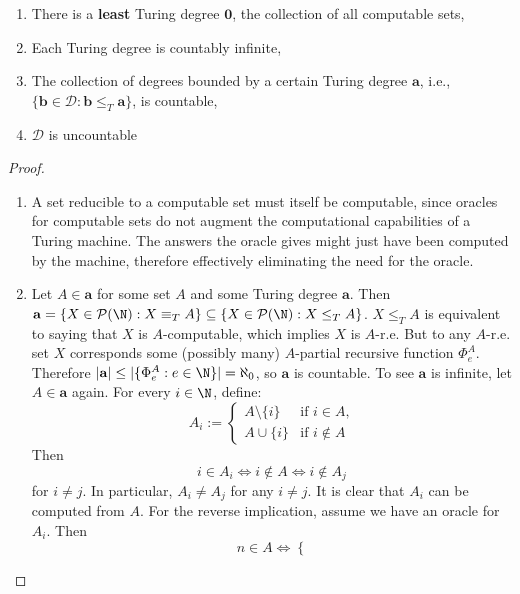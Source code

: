 \documentclass[../main.tex]{memoir}
\begin{document}
\begin{theorem}
  \begin{enumerate}
  \item There is a \textbf{least} Turing degree $\mathbf{0}$, the collection of all computable sets,
  \item Each Turing degree is countably infinite,
  \item The collection of degrees bounded by a certain Turing degree $\mathbf{a}$, i.e., $\{\mathbf{b} \in \mathbf{\mathcal{D}} : \mathbf{b} \le_T \mathbf{a}\}$, is countable,
  \item $\mathbf{\mathcal{D}}$ is uncountable
  \end{enumerate}
\end{theorem}
\begin{proof}
  \begin{enumerate}
  \item A set reducible to a computable set must itself be computable, since oracles for computable sets do not augment the computational capabilities of a Turing machine. The answers the oracle gives might just have been computed by the machine, therefore effectively eliminating the need for the oracle.
  \item Let $A \in \mathbf{a}$ for some set $A$ and some Turing degree $\mathbf{a}$. Then $\mathbf{a} = \{X \in \mathcal{P}(\N): X \equiv_T A\} \subseteq \{X \in \mathcal{P}(\N): X \le_T A\}$. $X \le_T A$ is equivalent to saying that $X$ is $A$-computable, which implies $X$ is $A$-r.e. But to any $A$-r.e. set $X$ corresponds some (possibly many) $A$-partial recursive function $\Phi_e^A$. Therefore $|\mathbf{a}| \le |\{\Phi_e^A: e \in \N\}| = \aleph_0$, so $\mathbf{a}$ is countable. To see $\mathbf{a}$ is infinite, let $A \in \mathbf{a}$ again. For every $i \in \N$, define:
    \begin{equation*}
      A_i := \left\{
        \begin{array}{lr}
          A \setminus \{i\} & \text{if } i \in A \text{,} \\
          A \cup \{i\} & \text{if } i \not\in A
        \end{array}
      \right.
    \end{equation*}
    Then
    \[ i \in A_i \iff i \not\in A \iff i \not\in A_j \]
    for $i \neq j$. In particular, $A_i \neq A_j$ for any $i \neq j$. It is clear that $A_i$ can be computed from $A$. For the reverse implication, assume we have an oracle for $A_i$. Then
    \begin{equation*}
      n \in A \iff \left\{

\end{equation*}
\end{enumerate}
\end{proof}
\end{document}
